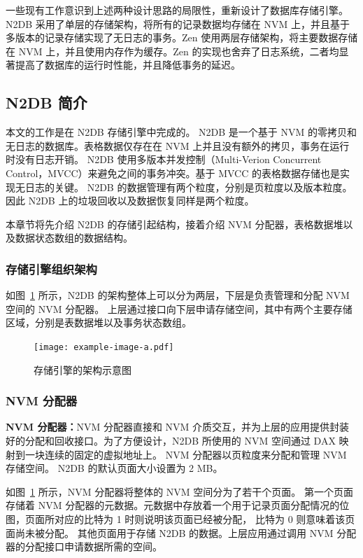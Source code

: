 一些现有工作意识到上述两种设计思路的局限性，重新设计了数据库存储引擎。N2DB 采用了单层的存储架构，将所有的记录数据均存储在 NVM 上，并且基于多版本的记录存储实现了无日志的事务\cite{liu_graduate}。Zen 使用两层存储架构，将主要数据存储在 NVM 上，并且使用内存作为缓存。Zen 的实现也舍弃了日志系统，二者均显著提高了数据库的运行时性能，并且降低事务的延迟\cite{liu_zen_2021}。

\subsection{N2DB 简介}
\label{ssec:n2db}
本文的工作是在 N2DB 存储引擎中完成的。
N2DB 是一个基于 NVM 的零拷贝和无日志的数据库。表格数据仅存在在 NVM 上并且没有额外的拷贝，事务在运行时没有日志开销。
N2DB 使用多版本并发控制（Multi-Verion Concurrent Control，MVCC）来避免之间的事务冲突。基于 MVCC 的表格数据存储也是实现无日志的关键。
N2DB 的数据管理有两个粒度，分别是页粒度以及版本粒度。
因此 N2DB 上的垃圾回收以及数据恢复同样是两个粒度。

本章节将先介绍 N2DB 的存储引起结构，接着介绍 NVM 分配器，表格数据堆以及数据状态数组的数据结构。



\subsubsection{存储引擎组织架构}

如图~\ref{fig:n2db} 所示，N2DB 的架构整体上可以分为两层，下层是负责管理和分配 NVM 空间的 NVM 分配器。
上层通过接口向下层申请存储空间，其中有两个主要存储区域，分别是表数据堆以及事务状态数组。

\begin{figure}
    \centering
    \texttt{[image: example-image-a.pdf]}
    \caption{存储引擎的架构示意图}
    \label{fig:n2db}
\end{figure}

\subsubsection{NVM 分配器}
\label{ssec:nvm-alloc}
\textbf{NVM 分配器：}NVM 分配器直接和 NVM 介质交互，并为上层的应用提供封装好的分配和回收接口。为了方便设计，N2DB 所使用的 NVM 空间通过 DAX 映射到一块连续的固定的虚拟地址上。
NVM 分配器以页粒度来分配和管理 NVM 存储空间。
N2DB 的默认页面大小设置为 2 MB。

如图~\ref{fig:n2db} 所示，NVM 分配器将整体的 NVM 空间分为了若干个页面。
第一个页面存储着 NVM 分配器的元数据。元数据中存放着一个用于记录页面分配情况的位图，页面所对应的比特为 1 时则说明该页面已经被分配，
比特为 0 则意味着该页面尚未被分配。
其他页面用于存储 N2DB 的数据。上层应用通过调用 NVM 分配器的分配接口申请数据所需的空间。

